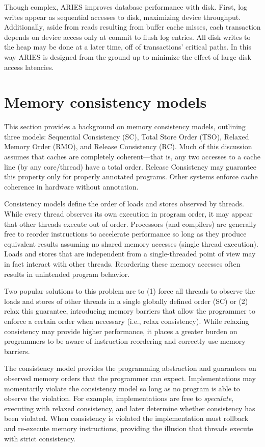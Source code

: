 Though complex, ARIES improves database performance with disk.
First, log writes appear as sequential accesses to disk, maximizing device throughput.
Additionally, aside from reads resulting from buffer cache misses, each transaction depends on device access only at commit to flush log entries.
All disk writes to the heap may be done at a later time, off of transactions' critical paths.
In this way ARIES is designed from the ground up to minimize the effect of large disk access latencies.

\section{Memory consistency models}
\label{sec:Background:MemoryConsistency}

This section provides a background on memory consistency models, outlining three models: Sequential Consistency (SC), Total Store Order (TSO), Relaxed Memory Order (RMO), and Release Consistency (RC).
Much of this discussion assumes that caches are completely coherent---that is, any two accesses to a cache line (by any core/thread) have a total order.
Release Consistency may guarantee this property only for properly annotated programs.
Other systems enforce cache coherence in hardware without annotation.

Consistency models define the order of loads and stores observed by threads.
While every thread observes its own execution in program order, it may appear that other threads execute out of order.
Processors (and compilers) are generally free to reorder instructions to accelerate performance so long as they produce equivalent results assuming no shared memory accesses (single thread execution).
Loads and stores that are independent from a single-threaded point of view may in fact interact with other threads.
Reordering these memory accesses often results in unintended program behavior.

Two popular solutions to this problem are to (1) force all threads to observe the loads and stores of other threads in a single globally defined order (SC) or (2) relax this guarantee, introducing memory barriers that allow the programmer to enforce a certain order when necessary (i.e., relax consistency).
While relaxing consistency may provide higher performance, it places a greater burden on programmers to be aware of instruction reordering and correctly use memory barriers.

The consistency model provides the programming abstraction and guarantees on observed memory orders that the programmer can expect.
Implementations may momentarily violate the consistency model so long as no program is able to observe the violation.
For example, implementations are free to \emph{speculate}, executing with relaxed consistency, and later determine whether consistency has been violated.
When consistency is violated the implementation must rollback and re-execute memory instructions, providing the illusion that threads execute with strict consistency.

